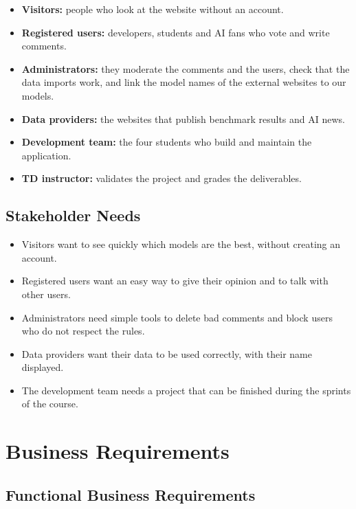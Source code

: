 \documentclass[11pt,a4paper]{article}
\begin{document}
\begin{itemize}
  \item \textbf{Visitors:} people who look at the website without an account.
  \item \textbf{Registered users:} developers, students and AI fans who vote and write comments.
  \item \textbf{Administrators:} they moderate the comments and the users, check that the data imports work, and link the model names of the external websites to our models.
  \item \textbf{Data providers:} the websites that publish benchmark results and AI news.
  \item \textbf{Development team:} the four students who build and maintain the application.
  \item \textbf{TD instructor:} validates the project and grades the deliverables.
\end{itemize}

\subsection{Stakeholder Needs}

\begin{itemize}
  \item Visitors want to see quickly which models are the best, without creating an account.
  \item Registered users want an easy way to give their opinion and to talk with other users.
  \item Administrators need simple tools to delete bad comments and block users who do not respect the rules.
  \item Data providers want their data to be used correctly, with their name displayed.
  \item The development team needs a project that can be finished during the sprints of the course.
\end{itemize}

\section{Business Requirements}

\subsection{Functional Business Requirements}
\end{document}
